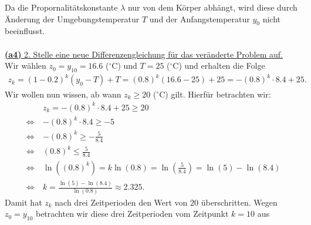 Da die Propornalitätskonstante $ \lambda $ nur von dem Körper abhängt, wird diese durch Änderung der Umgebungstemperatur $ T $ und der Anfangstemperatur $ y_0 $ nicht beeinflusst.\\
\\
\underline{\textbf{(a4)} 2. Stelle eine neue Differenzengleichung für das veränderte Problem auf.}\\
Wir wählen $ z_0 = y_{10} = 16.6 $ ($ ^\circ  $C) und $ T = 25 $ ($ ^\circ  $C) und erhalten die Folge
\begin{align*}
	z_k = (1 - 0.2)^k (y_0 - T) + T
	=
	(0.8)^k (16.6 - 25) + 25
	=
	-(0.8)^k \cdot 8.4 + 25.
\end{align*}
Wir wollen nun wissen, ab wann $ z_k \geq 20 $ ($ ^\circ  $C) gilt.
Hierfür betrachten wir:
\begin{align*}
	&z_k = - (0.8)^k \cdot 8.4 + 25 \geq 20\\
	\ \Leftrightarrow\
	&-(0.8)^k \cdot 8.4  \geq -5\\
	\ \Leftrightarrow \
	&-(0.8)^k \geq -\frac{5}{8.4}\\
	\ \Leftrightarrow \
	&(0.8)^k \leq \frac{5}{8.4}\\
	\ \Leftrightarrow \
	&\ln((0.8)^k) = k \ln(0.8) = \ln\left(\frac{5}{8.4}\right)
	= \ln(5) - \ln(8.4)\\
	\ \Leftrightarrow \
	&k = \frac{\ln(5) - \ln(8.4)}{\ln(0.8)}
	\approx
	2.325.
\end{align*}
Damit hat $ z_k $ nach drei Zeitperioden den Wert von $  20 $ überschritten. Wegen $ z_0 = y_{10} $ betrachten wir diese drei Zeitperioden vom Zeitpunkt $ k = 10 $ aus





\newpage

